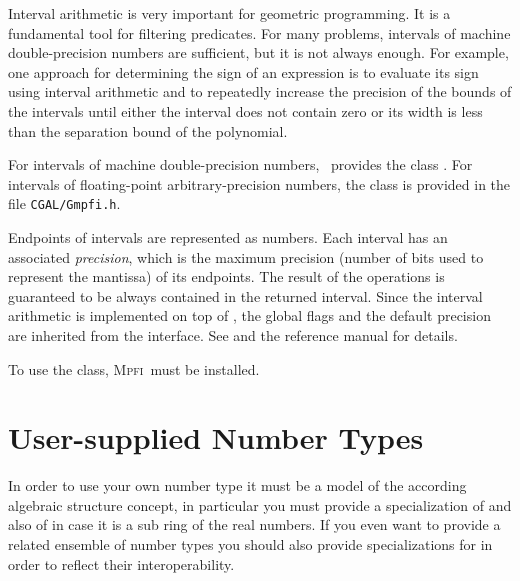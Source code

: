 Interval arithmetic is very important for geometric programming. It
is a fundamental tool for filtering predicates. For many problems,
intervals of machine double-precision numbers are sufficient, but it is
not always enough. For example, one approach for determining the sign of
an expression is to evaluate its sign using interval arithmetic and to
repeatedly increase the precision of the bounds of the intervals until
either the interval does not contain zero or its width is less than the
separation bound of the polynomial.

For intervals of machine double-precision numbers, \cgal~provides
the class . For intervals of floating-point
arbitrary-precision numbers, the class  is provided in the
file {\tt CGAL/Gmpfi.h}.

Endpoints of  intervals are represented as 
numbers.  Each interval has an associated \emph{precision}, which is
the maximum precision (number of bits used to represent the mantissa)
of its endpoints.  The result of the operations is guaranteed to be
always contained in the returned interval. Since the interval arithmetic
is implemented on top of , the global flags and the default
precision are inherited from the  interface. See
\cite{cgal:r-mpfi} and the  reference manual for details.

To use the  class, \textsc{Mpfi}\ must be installed.


\section{User-supplied Number Types}

In order to use your own number type it must be a model of the according
algebraic structure concept, in particular you must provide a 
specialization of  and also of
 in case it is a sub ring of the real numbers. 
If you even want to provide a related ensemble of number types you should also 
provide specializations for  in order to 
reflect their interoperability. 
 



